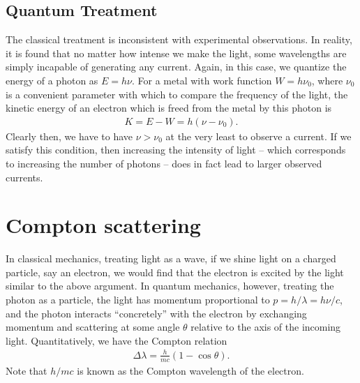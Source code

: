 \subsection{Quantum Treatment}

The classical treatment is inconsistent with experimental observations.
In reality, it is found that no matter how intense we make the light, some wavelengths are simply incapable of generating any current.
Again, in this case, we quantize the energy of a photon as $E = h \nu$.
For a metal with work function $W = h \nu_0$, where $\nu_0$ is a convenient parameter with which to compare the frequency of the light, the kinetic energy of an electron which is freed from the metal by this photon is
\begin{eqnarray}
    K = E - W = h (\nu - \nu_0)
.\end{eqnarray}
Clearly then, we have to have $\nu > \nu_0$ at the very least to observe a current.
If we satisfy this condition, then increasing the intensity of light -- which corresponds to increasing the number of photons -- does in fact lead to larger observed currents.


\section{Compton scattering}

In classical mechanics, treating light as a wave, if we shine light on a charged particle, say an electron, we would find that the electron is excited by the light similar to the above argument.
In quantum mechanics, however, treating the photon as a particle, the light has momentum proportional to $p = h/\lambda = h \nu / c$, and the photon interacts ``concretely'' with the electron by exchanging momentum and scattering at some angle $\theta$ relative to the axis of the incoming light.
Quantitatively, we have the Compton relation
\begin{eqnarray}
    \Delta \lambda = \frac{h}{m c} (1 - \cos{\theta})
.\end{eqnarray}
Note that $h/mc$ is known as the Compton wavelength of the electron.

